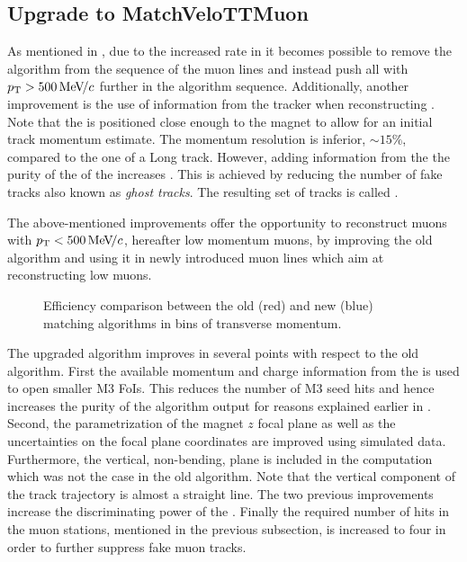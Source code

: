 \subsection{Upgrade to MatchVeloTTMuon}
\label{sec:matchvelottmuon}
As mentioned in , due to the increased \hltone rate in \runtwo it becomes possible to
remove the \mvm algorithm from the sequence of the \hltone muon lines and instead push all \veloTracks with
$\mbox{$p_{\rm T}$}>500 {\mathrm{\,Me\kern -0.1em V\!/}c}$ further in the algorithm sequence. Additionally, another improvement is the use of
information from the \ttracker tracker when reconstructing \veloTracks \cite{LHCb-PUB-2015-005}.
Note that the \ttracker is positioned close enough to the \lhcb magnet to allow for an initial track momentum estimate.
The \ttracker momentum resolution is inferior, $\sim 15\%$, compared to the one of a Long track.
However, adding information from the \ttracker the purity of the of the \veloTracks increases \cite{Bowen:2105078}.
This is achieved by reducing the number of fake tracks also known as {\it ghost tracks}.
The resulting set of tracks is called \veloTTracks.

The above-mentioned improvements offer the opportunity to reconstruct muons with $\mbox{$p_{\rm T}$}<500 {\mathrm{\,Me\kern -0.1em V\!/}c}$,
hereafter low momentum muons, by improving the old \mvm algorithm and using it in newly introduced
\hltone muon lines which aim at reconstructing low \pt muons.

\begin{figure}[t]
  \centering
    \scalebox{.6}{}
  \caption{Efficiency comparison between the old (red) and new (blue) matching algorithms in bins of transverse momentum.}
 \label{mvm_eff_pt_zoom_comp}
\end{figure}

The upgraded \mvTTm algorithm improves in several points with respect to the old \mvm algorithm.
First the available momentum and charge information from the \ttracker is used to open smaller M3 FoIs.
This reduces the number of M3 seed hits and hence increases the purity of the \mvTTm algorithm output
for reasons explained earlier in . Second, the parametrization of the magnet $z$
focal plane as well as the uncertainties on the focal plane coordinates are improved using simulated data.
Furthermore, the vertical, non-bending, plane is included in the \chisq computation which was not the
case in the old \mvm algorithm. Note that the vertical component of the track trajectory is almost a straight
line. The two previous improvements increase the discriminating power of the \chisq. Finally the required number
of hits in the muon stations, mentioned in the previous subsection, is increased to four in order to further
suppress fake muon tracks.

